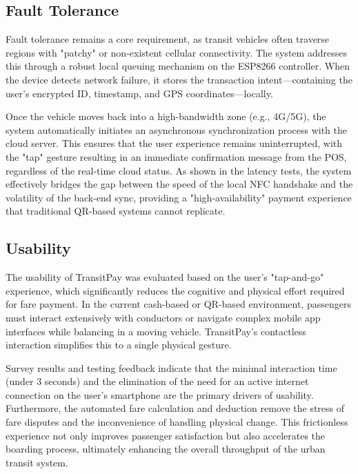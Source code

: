\documentclass[manuscript,review,anonymous]{acmart}
\begin{document}
\subsection{Fault Tolerance}

Fault tolerance remains a core requirement, as transit vehicles often traverse regions with "patchy" or non-existent cellular connectivity. The system addresses this through a robust local queuing mechanism on the ESP8266 controller. When the device detects network failure, it stores the transaction intent—containing the user's encrypted ID, timestamp, and GPS coordinates—locally. 

Once the vehicle moves back into a high-bandwidth zone (e.g., 4G/5G), the system automatically initiates an asynchronous synchronization process with the cloud server. This ensures that the user experience remains uninterrupted, with the "tap" gesture resulting in an immediate confirmation message from the POS, regardless of the real-time cloud status. As shown in the latency tests, the system effectively bridges the gap between the speed of the local NFC handshake and the volatility of the back-end sync, providing a "high-availability" payment experience that traditional QR-based systems cannot replicate.

\subsection{Usability}

The usability of TransitPay was evaluated based on the user's "tap-and-go" experience, which significantly reduces the cognitive and physical effort required for fare payment. In the current cash-based or QR-based environment, passengers must interact extensively with conductors or navigate complex mobile app interfaces while balancing in a moving vehicle. TransitPay's contactless interaction simplifies this to a single physical gesture. 

Survey results and testing feedback indicate that the minimal interaction time (under 3 seconds) and the elimination of the need for an active internet connection on the user's smartphone are the primary drivers of usability. Furthermore, the automated fare calculation and deduction remove the stress of fare disputes and the inconvenience of handling physical change. This frictionless experience not only improves passenger satisfaction but also accelerates the boarding process, ultimately enhancing the overall throughput of the urban transit system.
\end{document}
